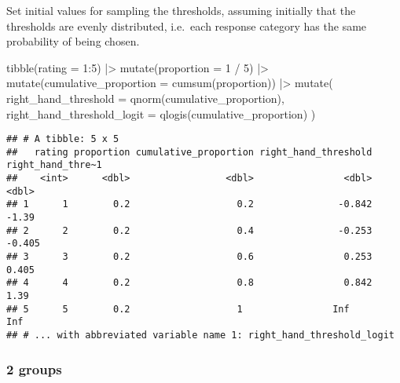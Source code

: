 \documentclass[
  man,floatsintext]{apa7}
\newenvironment{Shaded}{\begin{snugshade}}{\end{snugshade}}
\newcommand{\AttributeTok}[1]{\textcolor[rgb]{0.77,0.63,0.00}{#1}}
\newcommand{\DecValTok}[1]{\textcolor[rgb]{0.00,0.00,0.81}{#1}}
\newcommand{\FunctionTok}[1]{\textcolor[rgb]{0.00,0.00,0.00}{#1}}
\newcommand{\NormalTok}[1]{#1}
\newcommand{\SpecialCharTok}[1]{\textcolor[rgb]{0.00,0.00,0.00}{#1}}
\begin{document}
Set initial values for sampling the thresholds, assuming initially that the thresholds are evenly distributed, i.e.~each response category has the same probability of being chosen.

\begin{Shaded}
\begin{Highlighting}[]
\FunctionTok{tibble}\NormalTok{(}\AttributeTok{rating =} \DecValTok{1}\SpecialCharTok{:}\DecValTok{5}\NormalTok{) }\SpecialCharTok{|\textgreater{}}
  \FunctionTok{mutate}\NormalTok{(}\AttributeTok{proportion =} \DecValTok{1} \SpecialCharTok{/} \DecValTok{5}\NormalTok{) }\SpecialCharTok{|\textgreater{}}
  \FunctionTok{mutate}\NormalTok{(}\AttributeTok{cumulative\_proportion =} \FunctionTok{cumsum}\NormalTok{(proportion)) }\SpecialCharTok{|\textgreater{}}
  \FunctionTok{mutate}\NormalTok{(}
    \AttributeTok{right\_hand\_threshold =} \FunctionTok{qnorm}\NormalTok{(cumulative\_proportion),}
    \AttributeTok{right\_hand\_threshold\_logit =} \FunctionTok{qlogis}\NormalTok{(cumulative\_proportion)}
\NormalTok{  )}
\end{Highlighting}
\end{Shaded}

\begin{verbatim}
## # A tibble: 5 x 5
##   rating proportion cumulative_proportion right_hand_threshold right_hand_thre~1
##    <int>      <dbl>                 <dbl>                <dbl>             <dbl>
## 1      1        0.2                   0.2               -0.842            -1.39 
## 2      2        0.2                   0.4               -0.253            -0.405
## 3      3        0.2                   0.6                0.253             0.405
## 4      4        0.2                   0.8                0.842             1.39 
## 5      5        0.2                   1                Inf               Inf    
## # ... with abbreviated variable name 1: right_hand_threshold_logit
\end{verbatim}

\hypertarget{groups-3}{%
\subsubsection{2 groups}\label{groups-3}}
\end{document}

